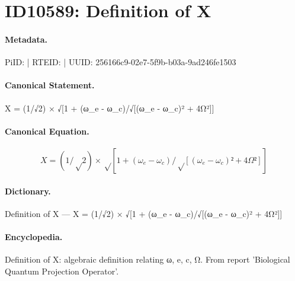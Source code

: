 \section*{ID10589: Definition of X}
\paragraph{Metadata.}
PiID:  | RTEID:  | UUID: 256166c9-02e7-5f9b-b03a-9ad246fe1503

\paragraph{Canonical Statement.}
X = (1/√2) × √[1 + (ω\_e - ω\_c)/√[(ω\_e - ω\_c)² + 4Ω²]]

\paragraph{Canonical Equation.}
\[
X = (1/√2) × √[1 + (ω_e - ω_c)/√[(ω_e - ω_c)² + 4Ω²]]
\]

\paragraph{Dictionary.}
Definition of X — X = (1/√2) × √[1 + (ω\_e - ω\_c)/√[(ω\_e - ω\_c)² + 4Ω²]]

\paragraph{Encyclopedia.}
Definition of X: algebraic definition relating ω, e, c, Ω. From report 'Biological Quantum Projection Operator'.
